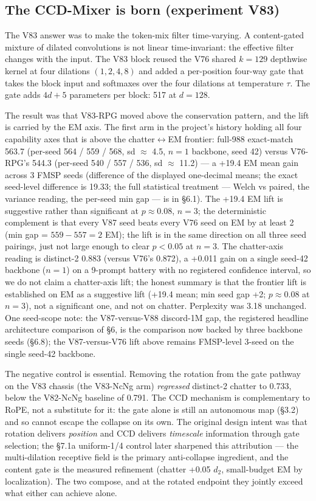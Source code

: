 \documentclass[11pt]{article}
\begin{document}
\subsection{The CCD-Mixer is born (experiment V83)}

The V83 answer was to make the token-mix filter time-varying. A content-gated mixture of dilated convolutions is not linear time-invariant: the effective filter changes with the input. The V83 block reused the V76 shared $k=129$ depthwise kernel at four dilations $(1, 2, 4, 8)$ and added a per-position four-way gate that takes the block input and softmaxes over the four dilations at temperature $\tau$. The gate adds $4d+5$ parameters per block: 517 at $d=128$.

The result was that V83-RPG moved above the conservation pattern, and the lift is carried by the EM axis. The first arm in the project's history holding all four capability axes that is above the chatter$\leftrightarrow$EM frontier: full-988 exact-match 563.7 (per-seed 564 / 559 / 568, sd $\approx$ 4.5, $n=1$ backbone, seed 42) versus V76-RPG's 544.3 (per-seed 540 / 557 / 536, sd $\approx$ 11.2) --- a +19.4 EM mean gain across 3 FMSP seeds (difference of the displayed one-decimal means; the exact seed-level difference is 19.33; the full statistical treatment --- Welch vs paired, the variance reading, the per-seed min gap --- is in \S6.1). The +19.4 EM lift is suggestive rather than significant at $p \approx 0.08$, $n=3$; the deterministic complement is that every V87 seed beats every V76 seed on EM by at least 2 (min gap = $559 - 557 = 2$ EM); the lift is in the same direction on all three seed pairings, just not large enough to clear $p < 0.05$ at $n = 3$. The chatter-axis reading is distinct-2 0.883 (versus V76's 0.872), a +0.011 gain on a single seed-42 backbone ($n=1$) on a 9-prompt battery with no registered confidence interval, so we do not claim a chatter-axis lift; the honest summary is that the frontier lift is established on EM as a suggestive lift (+19.4 mean; min seed gap +2; $p \approx 0.08$ at $n=3$), not a significant one, and not on chatter. Perplexity was 3.18 unchanged. One seed-scope note: the V87-versus-V88 discord-1M gap, the registered headline architecture comparison of \S6, is the comparison now backed by three backbone seeds (\S6.8); the V87-versus-V76 lift above remains FMSP-level 3-seed on the single seed-42 backbone.

The negative control is essential. Removing the rotation from the gate pathway on the V83 chassis (the V83-NcNg arm) \emph{regressed} distinct-2 chatter to 0.733, below the V82-NcNg baseline of 0.791. The CCD mechanism is complementary to RoPE, not a substitute for it: the gate alone is still an autonomous map (\S3.2) and so cannot escape the collapse on its own. The original design intent was that rotation delivers \emph{position} and CCD delivers \emph{timescale} information through gate selection; the \S7.1a uniform-1/4 control later sharpened this attribution --- the multi-dilation receptive field is the primary anti-collapse ingredient, and the content gate is the measured refinement (chatter +0.05 $d_2$, small-budget EM by localization). The two compose, and at the rotated endpoint they jointly exceed what either can achieve alone.
\end{document}
